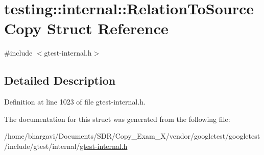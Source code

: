 \hypertarget{structtesting_1_1internal_1_1_relation_to_source_copy}{}\section{testing\+:\+:internal\+:\+:Relation\+To\+Source\+Copy Struct Reference}
\label{structtesting_1_1internal_1_1_relation_to_source_copy}


{\ttfamily \#include $<$gtest-\/internal.\+h$>$}



\subsection{Detailed Description}


Definition at line 1023 of file gtest-\/internal.\+h.



The documentation for this struct was generated from the following file\+:\begin{DoxyCompactItemize}
\item 
/home/bhargavi/\+Documents/\+S\+D\+R/\+Copy\+\_\+\+Exam\+\_\+X/vendor/googletest/googletest/include/gtest/internal/\hyperlink{gtest-internal_8h}{gtest-\/internal.\+h}\end{DoxyCompactItemize}
